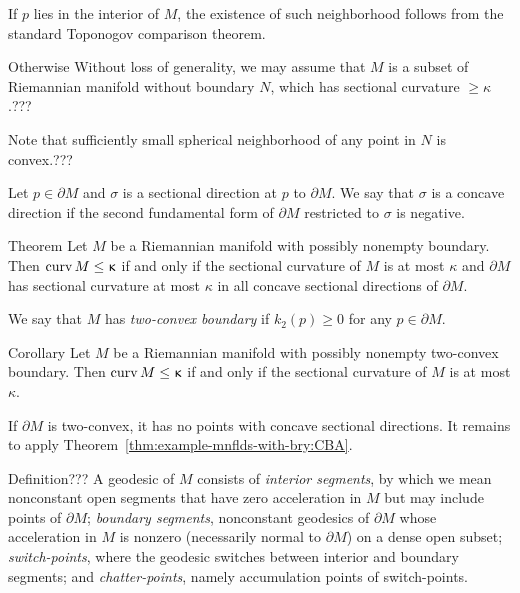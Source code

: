 If $p$ lies in the interior of $M$, 
the existence of such neighborhood 
follows from the standard Toponogov comparison theorem.

Otherwise 
Without loss of generality, we may assume that $M$ 
is a subset of Riemannian manifold without boundary $N$, 
which has sectional curvature $\ge \kappa$.???

Note that sufficiently small spherical neighborhood of 
any point in $N$ is convex.???\qeds


Let $p\in\partial M$ and $\sigma$ is a sectional direction at $p$ to $\partial M$.
We say that $\sigma$ is a concave direction if the second fundamental form of $\partial M$ restricted to $\sigma$ is negative.

\begin{thm}{Theorem}\label{thm:example-mnflds-with-bry:CBA}
Let $M$ be a Riemannian manifold with possibly nonempty boundary.
Then
$\curv M\le \kappa$
if and only if the sectional curvature of $M$ is at most $\kappa$
and $\partial M$ has sectional curvature at most $\kappa$ 
in all concave sectional directions of $\partial M$.
\end{thm}

We say that $M$ has \emph{two-convex boundary} 
if $k_2(p)\ge 0$ for any $p\in\partial M$.

%

\begin{thm}{Corollary}
Let $M$ be a Riemannian manifold with possibly nonempty two-convex boundary.
Then $\curv M\le{\kappa}$ 
if and only if the sectional curvature of $M$ is at most $\kappa$.
\end{thm}

If $\partial M$ is two-convex, 
it has no points with concave sectional directions.
It remains to apply Theorem~\ref{thm:example-mnflds-with-bry:CBA}.
\qeds

\begin{thm}{Definition}\label{def:mwb-segment}??? A geodesic of $M$ consists of  \emph{interior
segments}, by which we mean nonconstant open segments  that have zero acceleration in $M$ but
may include points of $\partial M$;  \emph{boundary segments}, nonconstant geodesics of $\partial M$ whose acceleration in $M$ is nonzero (necessarily normal to $\partial M$) on a dense open subset; \emph{switch-points}, where the geodesic switches between interior and boundary segments;  and \emph{chatter-points}, namely accumulation points of switch-points. 
\end{thm}

